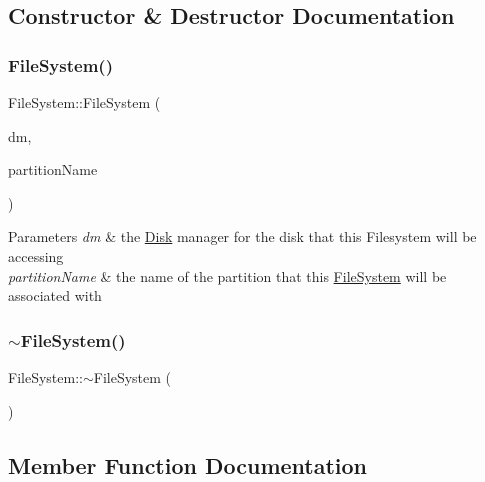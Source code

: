 \subsection{Constructor \& Destructor Documentation}
\mbox{\label{class_file_system_a1466c6d1e9636cecd44f0dd68ef710b5}} 
\subsubsection{\texorpdfstring{File\+System()}{FileSystem()}}
{\footnotesize\ttfamily File\+System\+::\+File\+System (\begin{DoxyParamCaption}\item[{\mbox{\hyperlink{class_disk_manager}{Disk\+Manager}} $\ast$}]{dm,  }\item[{string}]{partition\+Name }\end{DoxyParamCaption})}


\begin{DoxyParams}{Parameters}
{\em dm} & the \mbox{\hyperlink{class_disk}{Disk}} manager for the disk that this Filesystem will be accessing \\
\hline
{\em partition\+Name} & the name of the partition that this \mbox{\hyperlink{class_file_system}{File\+System}} will be associated with \\
\hline
\end{DoxyParams}
\mbox{\label{class_file_system_a9e366f036e9d9cd884fa689963aacc49}} 
\subsubsection{\texorpdfstring{$\sim$\+File\+System()}{~FileSystem()}}
{\footnotesize\ttfamily File\+System\+::$\sim$\+File\+System (\begin{DoxyParamCaption}{ }\end{DoxyParamCaption})}



\subsection{Member Function Documentation}
\mbox{\label{class_file_system_a3362c6b1cabc3497ac41542e94837e4a}} 
